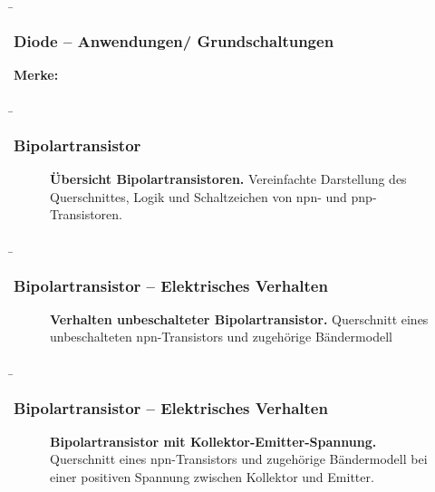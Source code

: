 \begin{frame}
    \b{\frametitle{Diode -- Anwendungen/ Grundschaltungen}
        \textbf{Merke:}
        \begin{itemize}
        \end{itemize}
        }
\end{frame}

\begin{frame}
    \b{ \frametitle{Bipolartransistor}
    \begin{figure}[H]
        \centering
        \scalebox{0.8}{}
        \caption{\textbf{Übersicht Bipolartransistoren.} Vereinfachte Darstellung des Querschnittes, Logik und Schaltzeichen von npn- und pnp-Transistoren.}  
    \end{figure}
    }
\end{frame}

\begin{frame}
    \b{ \frametitle{Bipolartransistor -- Elektrisches Verhalten}
        \begin{figure}[H]
            \centering
            
            \caption{\textbf{Verhalten unbeschalteter Bipolartransistor.} Querschnitt eines unbeschalteten npn-Transistors und zugehörige Bändermodell}  
        \end{figure}
    }
\end{frame}

\begin{frame}
    \b{ \frametitle{Bipolartransistor -- Elektrisches Verhalten}
        \begin{figure}[H]
            \centering
            
            \caption{\textbf{Bipolartransistor mit Kollektor-Emitter-Spannung.} Querschnitt eines npn-Transistors und zugehörige Bändermodell bei einer positiven Spannung zwischen Kollektor und Emitter.}  
        \end{figure}
    }
\end{frame}

